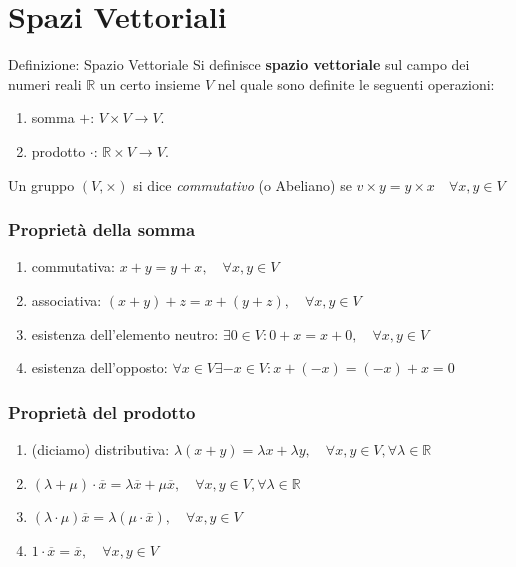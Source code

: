 \documentclass[x11names]{article}
\begin{document}
\newpage
\section{Spazi Vettoriali}
\begin{center}
\colorbox{myblue}{\begin{minipage}{5.75in}
\begin{blues}{Definizione: Spazio Vettoriale}
    Si definisce \textbf{spazio vettoriale} sul campo dei numeri reali $\mathbb{R}$ un certo insieme $V$ nel quale sono definite le seguenti operazioni:
    \begin{enumerate}
        \item somma $+$: $V \times V \longrightarrow V$.
        \item prodotto $\cdot$: $\mathbb{R} \times V \longrightarrow V$.
        \end{enumerate}
	Un gruppo $\left(V,\times \right)$ si dice \textit{commutativo} (o Abeliano) se $v \times y = y \times x \quad \forall x,y \in V$
\end{blues}
\end{minipage}}        
\end{center}


\subsubsection{Proprietà della somma}
\begin{enumerate}
    \item commutativa: $x + y = y + x, \quad \forall x,y \in V$
    \item associativa: $(x+y)+z = x + (y+z),\quad \forall x,y \in V$
    \item esistenza dell'elemento neutro: $\exists 0 \in V : 0 + x = x +0, \quad \forall x,y \in V$
    \item esistenza dell'opposto: $\forall x \in V \exists -x \in V : x + (-x) = (-x) +x = 0$
\end{enumerate}
\subsubsection{Proprietà del prodotto}
\begin{enumerate}
    \item (diciamo) distributiva: $\lambda(x+y) = \lambda x + \lambda y,\quad \forall x,y \in V, \forall \lambda \in \mathbb{R}$
    \item $(\lambda + \mu)\cdot \overline{x} = \lambda \overline{x} + \mu \overline{x}, \quad \forall x,y \in V, \forall \lambda \in \mathbb{R}$
    \item $(\lambda \cdot \mu)\overline{x} = \lambda(\mu \cdot \overline{x}),\quad \forall x,y \in V$
    \item $1 \cdot \overline{x} = \overline{x}, \quad \forall x,y \in V$
\end{enumerate}
\end{document}
